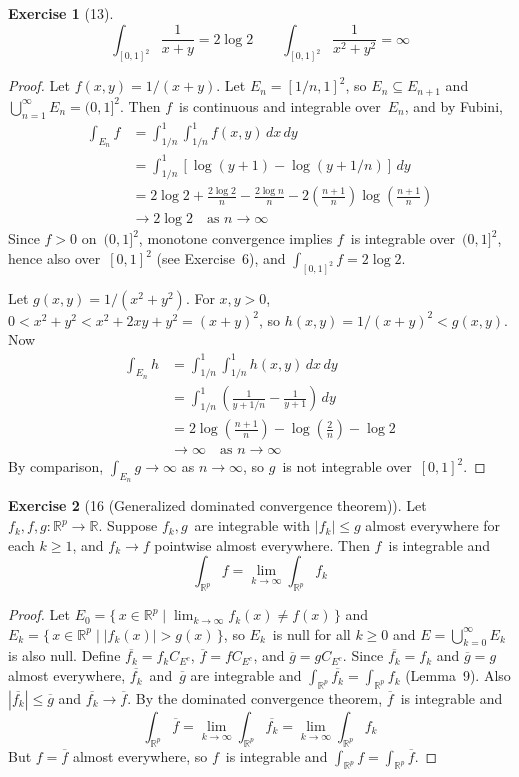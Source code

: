 \documentclass[letterpaper,12pt]{article}
\newcommand{\R}{\mathbb{R}}
\newcommand{\bigunion}{\bigcup}
\renewcommand{\d}[1]{\,d\!{#1}}
\newcommand{\dx}{\d{x}}
\newcommand{\dy}{\d{y}}
\newcommand{\abs}[1]{|{#1}|}
\newcommand{\comp}[1]{#1^c}
\theoremstyle{plain}
\theoremstyle{definition}
\newtheorem*{exer}{Exercise}
\theoremstyle{remark}
\begin{document}
\begin{exer}[13]
\[\int_{[0,1]^2}\frac{1}{x+y}=2\log 2\qquad\int_{[0,1]^2}\frac{1}{x^2+y^2}=\infty\]
\end{exer}
\begin{proof}
Let \(f(x,y)=1/(x+y)\). Let \(E_n=[1/n,1]^2\), so \(E_n\subseteq E_{n+1}\) and \(\bigunion_{n=1}^{\infty}E_n=(0,1]^2\). Then \(f\)~is continuous and integrable over~\(E_n\), and by Fubini,
\begin{align*}
\int_{E_n}f&=\int_{1/n}^1\int_{1/n}^1 f(x,y)\dx\dy\\
	&=\int_{1/n}^1\left[\log(y+1)-\log(y+1/n)\right]\dy\\
	&=2\log 2+\frac{2\log 2}{n}-\frac{2\log n}{n}-2\left(\frac{n+1}{n}\right)\log\left(\frac{n+1}{n}\right)\\
	&\to 2\log 2\quad\text{as }n\to\infty
\end{align*}
Since \(f>0\) on~\((0,1]^2\), monotone convergence implies \(f\)~is integrable over~\((0,1]^2\), hence also over~\([0,1]^2\) (see Exercise~6), and \(\int_{[0,1]^2}f=2\log 2\).

Let \(g(x,y)=1/(x^2+y^2)\). For \(x,y>0\), \(0<x^2+y^2<x^2+2xy+y^2=(x+y)^2\), so \(h(x,y)=1/(x+y)^2<g(x,y)\). Now
\begin{align*}
\int_{E_n}h&=\int_{1/n}^1\int_{1/n}^1 h(x,y)\dx\dy\\
	&=\int_{1/n}^1\left(\frac{1}{y+1/n}-\frac{1}{y+1}\right)\dy\\
	&=2\log\left(\frac{n+1}{n}\right)-\log\left(\frac{2}{n}\right)-\log 2\\
	&\to\infty\quad\text{as }n\to\infty
\end{align*}
By comparison, \(\int_{E_n}g\to\infty\) as \(n\to\infty\), so \(g\)~is not integrable over~\([0,1]^2\).
\end{proof}

\begin{exer}[16 (Generalized dominated convergence theorem)]
Let \(f_k,f,g:\R^p\to\R\). Suppose \(f_k,g\)~are integrable with \(\abs{f_k}\le g\) almost everywhere for each \(k\ge1\), and \(f_k\to f\) pointwise almost everywhere. Then \(f\)~is integrable and
\[\int_{\R^p}f=\lim_{k\to\infty}\int_{\R^p}f_k\]
\end{exer}
\begin{proof}
Let  \(E_0=\{\,x\in\R^p\mid\lim_{k\to\infty}f_k(x)\ne f(x)\,\}\) and \(E_k=\{\,x\in\R^p\mid\abs{f_k(x)}>g(x)\,\}\), so \(E_k\)~is null for all \(k\ge 0\) and \(E=\bigunion_{k=0}^{\infty}E_k\) is also null. Define \(\overline{f_k}=f_k C_{\comp{E}}\), \(\overline{f}=f C_{\comp{E}}\), and \(\overline{g}=g C_{\comp{E}}\). Since \(\overline{f_k}=f_k\) and \(\overline{g}=g\) almost everywhere, \(\overline{f_k}\)~and~\(\overline{g}\) are integrable and \(\int_{\R^p}\overline{f_k}=\int_{\R^p}f_k\) (Lemma~9). Also \(\abs{\overline{f_k}}\le\overline{g}\) and \(\overline{f_k}\to\overline{f}\). By the dominated convergence theorem, \(\overline{f}\)~is integrable and
\[\int_{\R^p}\overline{f}=\lim_{k\to\infty}\int_{\R^p}\overline{f_k}=\lim_{k\to\infty}\int_{\R^p}f_k\]
But \(f=\overline{f}\) almost everywhere, so \(f\)~is integrable and \(\int_{\R^p}f=\int_{\R^p}\overline{f}\).
\end{proof}
\end{document}
